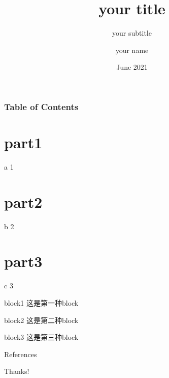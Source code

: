 \documentclass[16pt,xcolor=dvipsnames]{beamer}
\title[脚注处的标题]{your title}
\subtitle{your subtitle}
\author[脚注处的名字]{
    your name
}
\institute[脚注处的机构]{
    Nanjing University\\
    Kuang Yaming honors school
}
\date[脚注处的日期]{June 2021}
\begin{document}
\begin{frame}%
    \maketitle
\end{frame}


\begin{frame}%
    \frametitle{Table of Contents}
    \tableofcontents
\end{frame}

\section{part1}
\begin{frame}{a}
    1%
\end{frame}

\section{part2}
\begin{frame}{b}
    2
\end{frame}

\section{part3}
\begin{frame}{c}
    3
\end{frame}

\begin{frame}
    \begin{block}{block1}
    这是第一种block
    \end{block}
    \begin{exampleblock}{block2}
    这是第二种block
    \end{exampleblock}
    \begin{alertblock}{block3}
    这是第三种block
    \end{alertblock}
\end{frame}



\begin{frame}{References}%
    \nocite{*}
	\printbibliography
\end{frame}


\begin{frame}%
	\Huge
    \begin{center}
        Thanks!
    \end{center}
\end{frame}
\end{document}
